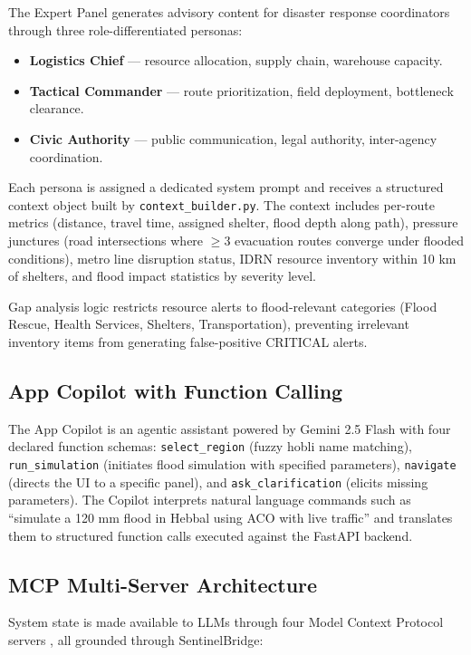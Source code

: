\documentclass[journal]{IEEEtran}
\begin{document}
The Expert Panel generates advisory content for disaster response coordinators through
three role-differentiated personas:
\begin{itemize}
  \item \textbf{Logistics Chief} — resource allocation, supply chain, warehouse capacity.
  \item \textbf{Tactical Commander} — route prioritization, field deployment, bottleneck
  clearance.
  \item \textbf{Civic Authority} — public communication, legal authority, inter-agency
  coordination.
\end{itemize}
Each persona is assigned a dedicated system prompt and receives a structured context object
built by \texttt{context\_builder.py}. The context includes per-route metrics (distance,
travel time, assigned shelter, flood depth along path), pressure junctures (road
intersections where $\geq 3$ evacuation routes converge under flooded conditions), metro
line disruption status, IDRN resource inventory within 10 km of shelters, and flood impact
statistics by severity level.

Gap analysis logic restricts resource alerts to flood-relevant categories (Flood Rescue,
Health Services, Shelters, Transportation), preventing irrelevant inventory items from
generating false-positive CRITICAL alerts.

\subsection{App Copilot with Function Calling}

The App Copilot is an agentic assistant powered by Gemini 2.5 Flash with four declared
function schemas: \texttt{select\_region} (fuzzy hobli name matching), \texttt{run\_simulation}
(initiates flood simulation with specified parameters), \texttt{navigate} (directs the UI
to a specific panel), and \texttt{ask\_clarification} (elicits missing parameters). The
Copilot interprets natural language commands such as ``simulate a 120 mm flood in Hebbal
using ACO with live traffic'' and translates them to structured function calls executed
against the FastAPI backend.

\subsection{MCP Multi-Server Architecture}

System state is made available to LLMs through four Model Context Protocol servers
\cite{anthropic2024mcp}, all grounded through SentinelBridge:
\end{document}
